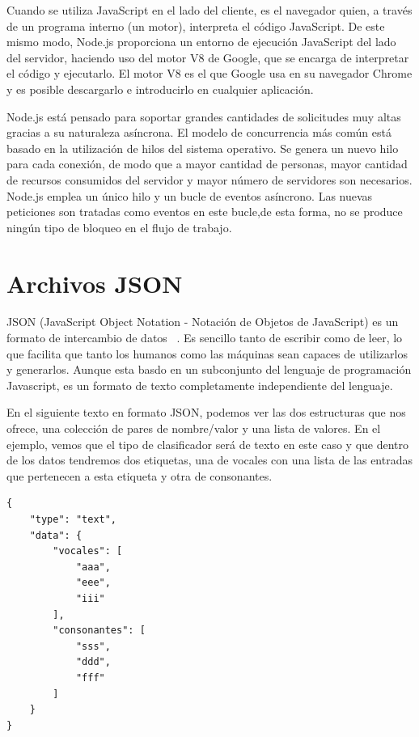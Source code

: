 \documentclass[a4paper, 12pt]{book}
\begin{document}
Cuando se utiliza JavaScript en el lado del cliente, es el navegador quien, a través de un programa interno (un motor), interpreta el código JavaScript. De este mismo modo, Node.js proporciona un entorno de ejecución JavaScript del lado del servidor, haciendo uso del motor V8 de Google, que se encarga de interpretar el código y ejecutarlo.
El motor V8 es el que Google usa en su navegador Chrome y es posible descargarlo e introducirlo en cualquier aplicación.

Node.js está pensado para soportar grandes cantidades de solicitudes muy altas gracias a su naturaleza asíncrona. El modelo de concurrencia más común está basado en la utilización de hilos del sistema operativo. Se genera un nuevo hilo para cada conexión, de modo que a mayor cantidad de personas, mayor cantidad de recursos consumidos del servidor y mayor número de servidores son necesarios. Node.js emplea un único hilo y un bucle de eventos asíncrono. Las nuevas peticiones son tratadas como eventos en este bucle,de esta forma, no se produce ningún tipo de bloqueo en el flujo de trabajo.

\section{Archivos JSON} 
\label{sec:archivosjson}

JSON (JavaScript Object Notation - Notación de Objetos de JavaScript) es un formato de intercambio de datos ~\cite{json}. Es sencillo tanto de escribir como de leer, lo que facilita que tanto los humanos como las máquinas sean capaces de utilizarlos y generarlos. Aunque esta basdo en un subconjunto del lenguaje de programación Javascript, es un formato de texto completamente independiente del lenguaje.

En el siguiente texto en formato JSON, podemos ver las dos estructuras que nos ofrece, una colección de pares de nombre/valor y una lista de valores. En el ejemplo, vemos que el tipo de clasificador será de texto en este caso y que dentro de los datos tendremos dos etiquetas, una de vocales con una lista de las entradas que pertenecen a esta etiqueta y otra de consonantes. 
{\footnotesize
\begin{verbatim}
{
    "type": "text",
    "data": {
        "vocales": [
            "aaa",
            "eee",
            "iii"
        ],
        "consonantes": [
            "sss",
            "ddd",
            "fff"
        ]
    }
}
\end{verbatim}
}
\end{document}
